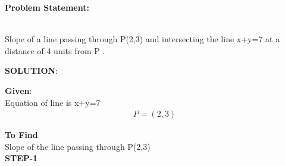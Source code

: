 \documentclass[10pt,a4paper]{report}
\begin{document}
\begin{multicols}{2}

\raggedright \textbf{Problem Statement:}\vspace{2mm}
\raggedright \\Slope of a line passing through P(2,3) and intersecting the line x+y=7 at a distance of 4 units from P  .\\
\vspace{5mm}

\raggedright \textbf{SOLUTION}:\vspace{2mm}\\

\raggedright \textbf{Given}:\vspace{2mm}\\
Equation of line is x+y=7 \\\vspace{1mm}
\begin{align}
P=(2,3)
\end{align}


\textbf{To Find }\vspace{2mm}\\
Slope of the line passing through P(2,3) \vspace{5mm}  \\ 
\textbf{STEP-1}\vspace{5mm}\\


\end{multicols}
\end{document}
